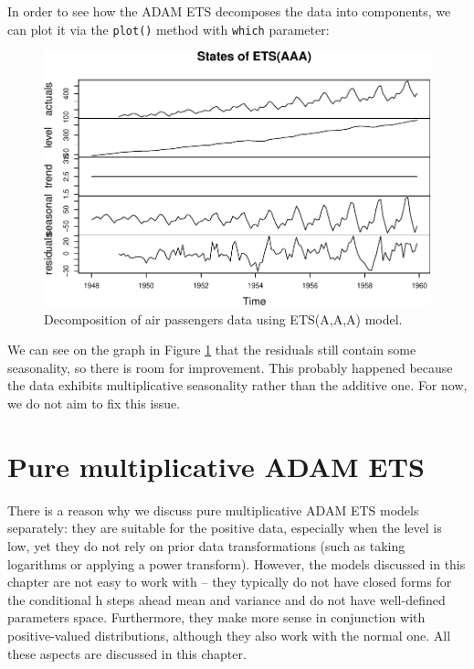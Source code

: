 \documentclass[]{book}
\theoremstyle{definition}
\theoremstyle{definition}
\theoremstyle{definition}
\theoremstyle{definition}
\theoremstyle{remark}
\begin{document}
In order to see how the ADAM ETS decomposes the data into components, we can plot it via the \texttt{plot()} method with \texttt{which} parameter:

\begin{figure}
\centering
\includegraphics{Svetunkov--2022----ADAM_files/figure-latex/AirPassengersAAADecomposition-1.pdf}
\caption{\label{fig:AirPassengersAAADecomposition}Decomposition of air passengers data using ETS(A,A,A) model.}
\end{figure}

We can see on the graph in Figure \ref{fig:AirPassengersAAADecomposition} that the residuals still contain some seasonality, so there is room for improvement. This probably happened because the data exhibits multiplicative seasonality rather than the additive one. For now, we do not aim to fix this issue.

\hypertarget{ADAMETSPureMultiplicativeChapter}{%
\chapter{Pure multiplicative ADAM ETS}\label{ADAMETSPureMultiplicativeChapter}}

There is a reason why we discuss pure multiplicative ADAM ETS models separately: they are suitable for the positive data, especially when the level is low, yet they do not rely on prior data transformations (such as taking logarithms or applying a power transform). However, the models discussed in this chapter are not easy to work with -- they typically do not have closed forms for the conditional h steps ahead mean and variance and do not have well-defined parameters space. Furthermore, they make more sense in conjunction with positive-valued distributions, although they also work with the normal one. All these aspects are discussed in this chapter.
\end{document}
